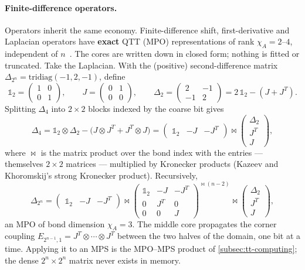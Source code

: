 \paragraph{Finite-difference operators.}
Operators inherit the same economy. Finite-difference shift, first-derivative
and Laplacian operators have \textbf{exact} QTT (MPO) representations of rank
$\chi_A = 2\text{--}4$, independent of $n$~\cite{Kazeev2012,Kazeev2013}. The
cores are written down in closed form; nothing is fitted or truncated. Take the
Laplacian. With the (positive) second-difference matrix
$\Delta_{2^n} = \mathrm{tridiag}(-1, 2, -1)$, define
\begin{equation*}
  \mathbb{1}_2 = \begin{pmatrix} 1 & 0 \\ 0 & 1 \end{pmatrix}, \qquad
  J = \begin{pmatrix} 0 & 1 \\ 0 & 0 \end{pmatrix}, \qquad
  \Delta_2 = \begin{pmatrix} 2 & -1 \\ -1 & 2 \end{pmatrix}
           = 2\,\mathbb{1}_2 - (J + J^{T}).
\end{equation*}
Splitting $\Delta_4$ into $2\times2$ blocks indexed by the coarse bit gives
\begin{equation*}
  \Delta_4 = \mathbb{1}_2 \otimes \Delta_2 - \big(J \otimes J^{T} + J^{T}\otimes J\big)
  = \begin{pmatrix} \mathbb{1}_2 & -J & -J^{T} \end{pmatrix} \bowtie
    \begin{pmatrix} \Delta_2 \\ J^{T} \\ J \end{pmatrix},
\end{equation*}
where $\bowtie$ is the matrix product over the bond index with the entries
--- themselves $2\times2$ matrices --- multiplied by Kronecker products
(Kazeev and Khoromskij's strong Kronecker product). Recursively,
\begin{equation}
  \Delta_{2^n} =
  \begin{pmatrix} \mathbb{1}_2 & -J & -J^{T} \end{pmatrix} \bowtie
  \begin{pmatrix}
    \mathbb{1}_2 & -J & -J^{T} \\
    0 & J^{T} & 0 \\
    0 & 0 & J
  \end{pmatrix}^{\bowtie (n-2)} \bowtie
  \begin{pmatrix} \Delta_2 \\ J^{T} \\ J \end{pmatrix},
  \label{eq:qtt-laplacian}
\end{equation}%
an MPO of bond dimension $\chi_A = 3$. The middle core propagates the corner
coupling $E_{2^{n-1},1} = J^{T}\otimes\cdots\otimes J^{T}$ between the two
halves of the domain, one bit at a time. Applying it to an MPS is the MPO--MPS
product of \cref{subsec:tt-computing}; the dense $2^n \times 2^n$ matrix never
exists in memory.

